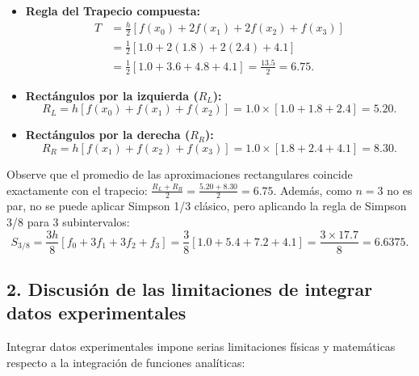 \documentclass[11pt,a4paper]{article}
\begin{document}
\begin{itemize}[leftmargin=*]
    \item \textbf{Regla del Trapecio compuesta:}
    \begin{align}
        T &= \frac{h}{2} \left[ f(x_0) + 2 f(x_1) + 2 f(x_2) + f(x_3) \right] \nonumber \\
          &= \frac{1}{2} \left[ 1.0 + 2(1.8) + 2(2.4) + 4.1 \right] \nonumber \\
          &= \frac{1}{2} \left[ 1.0 + 3.6 + 4.8 + 4.1 \right] = \frac{13.5}{2} = \mathbf{6.75}.
    \end{align}

    \item \textbf{Rectángulos por la izquierda ($R_L$):}
    \begin{equation}
        R_L = h \left[ f(x_0) + f(x_1) + f(x_2) \right] = 1.0 \times [1.0 + 1.8 + 2.4] = \mathbf{5.20}.
    \end{equation}

    \item \textbf{Rectángulos por la derecha ($R_R$):}
    \begin{equation}
        R_R = h \left[ f(x_1) + f(x_2) + f(x_3) \right] = 1.0 \times [1.8 + 2.4 + 4.1] = \mathbf{8.30}.
    \end{equation}
\end{itemize}

Observe que el promedio de las aproximaciones rectangulares coincide exactamente con el trapecio: $\frac{R_L + R_R}{2} = \frac{5.20 + 8.30}{2} = 6.75$. Además, como $n=3$ no es par, no se puede aplicar Simpson 1/3 clásico, pero aplicando la regla de Simpson 3/8 para 3 subintervalos:
\begin{equation}
    S_{3/8} = \frac{3h}{8} [f_0 + 3f_1 + 3f_2 + f_3] = \frac{3}{8} [1.0 + 5.4 + 7.2 + 4.1] = \frac{3 \times 17.7}{8} = \mathbf{6.6375}.
\end{equation}

\subsection{2. Discusión de las limitaciones de integrar datos experimentales}
Integrar datos experimentales impone serias limitaciones físicas y matemáticas respecto a la integración de funciones analíticas:
\end{document}
